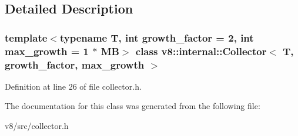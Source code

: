 \subsection{Detailed Description}
\subsubsection*{template$<$typename T, int growth\+\_\+factor = 2, int max\+\_\+growth = 1 $\ast$ MB$>$\newline
class v8\+::internal\+::\+Collector$<$ T, growth\+\_\+factor, max\+\_\+growth $>$}



Definition at line 26 of file collector.\+h.



The documentation for this class was generated from the following file\+:\begin{DoxyCompactItemize}
\item 
v8/src/collector.\+h\end{DoxyCompactItemize}
